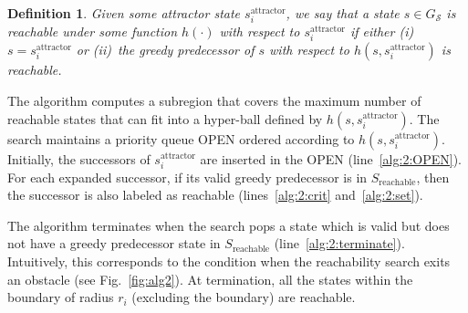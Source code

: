 \documentclass[letterpaper]{article} %
\newcommand{\calS}{\ensuremath{\mathcal{S}}\xspace}
\newcommand{\sAttract}{\ensuremath{s^{\text{attractor}}_i}\xspace}
\newtheorem{definition}{Definition}
\begin{document}
\vspace{2mm}
\begin{definition}
	Given some attractor state \sAttract, we say that a state $s \in G_\calS$ is reachable under some function $h(\cdot)$ with respect to \sAttract if either
	(i)~$s = \sAttract$ or
	(ii)~the greedy predecessor of $s$ with respect to $h(s,\sAttract)$ is reachable.
\end{definition}


The algorithm computes a subregion that covers the maximum number of reachable states that can fit into a hyper-ball defined by $h(s,\sAttract)$. 
The search maintains a priority queue OPEN ordered according to $h(s,\sAttract)$. Initially, the successors of $\sAttract$ are inserted in the OPEN (line~\ref{alg:2:OPEN}). For each expanded successor, if its valid greedy predecessor is in $S_{\text{reachable}}$, then the successor is also labeled as reachable (lines~\ref{alg:2:crit} and~\ref{alg:2:set}). 


The algorithm terminates when the search pops a state which is valid but does not have a greedy predecessor state in $S_{\text{reachable}}$ (line~\ref{alg:2:terminate}). Intuitively, this corresponds to  the condition when the reachability search exits an obstacle (see Fig.~\ref{fig:alg2}).
At termination, all the states within the boundary of radius $r_i$ (excluding the boundary) are reachable.
\end{document}
